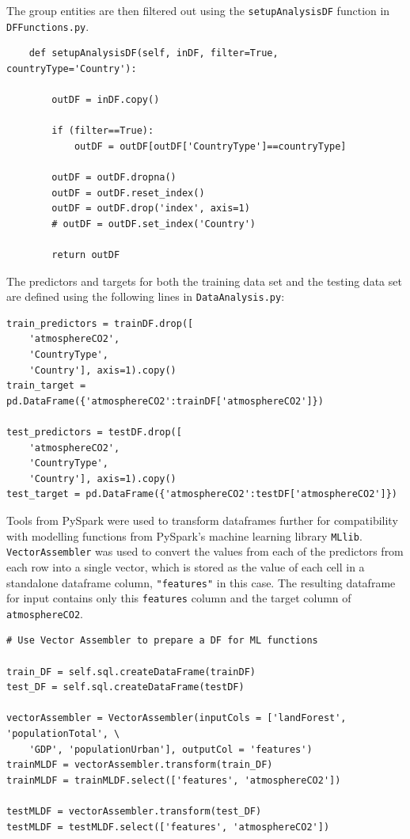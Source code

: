 \documentclass[11pt,a4paper,titlepage]{article}
\newcommand{\blankline}{\quad\pagebreak[2]}
\begin{document}
The group entities are then filtered out using the \texttt{setupAnalysisDF} function in \texttt{DFFunctions.py}. 

\begin{verbatim}
    def setupAnalysisDF(self, inDF, filter=True, countryType='Country'):

        outDF = inDF.copy()

        if (filter==True):
            outDF = outDF[outDF['CountryType']==countryType]

        outDF = outDF.dropna()
        outDF = outDF.reset_index()
        outDF = outDF.drop('index', axis=1)
        # outDF = outDF.set_index('Country')

        return outDF
\end{verbatim}

\blankline

The predictors and targets for both the training data set and the testing data set are defined using the following lines in \texttt{DataAnalysis.py}:

\begin{verbatim}
train_predictors = trainDF.drop([
    'atmosphereCO2',
    'CountryType',
    'Country'], axis=1).copy()
train_target = pd.DataFrame({'atmosphereCO2':trainDF['atmosphereCO2']})

test_predictors = testDF.drop([
    'atmosphereCO2',
    'CountryType',
    'Country'], axis=1).copy()
test_target = pd.DataFrame({'atmosphereCO2':testDF['atmosphereCO2']})
\end{verbatim}

\blankline

Tools from PySpark were used to transform dataframes further for compatibility with modelling functions from PySpark's machine learning library \texttt{MLlib}. \texttt{VectorAssembler} was used to convert the values from each of the predictors from each row into a single vector, which is stored as the value of each cell in a standalone dataframe column, \texttt{"features"} in this case. The resulting dataframe for input contains only this \texttt{features} column and the target column of \texttt{atmosphereCO2}. 

\begin{verbatim}
# Use Vector Assembler to prepare a DF for ML functions

train_DF = self.sql.createDataFrame(trainDF)
test_DF = self.sql.createDataFrame(testDF)

vectorAssembler = VectorAssembler(inputCols = ['landForest', 'populationTotal', \
    'GDP', 'populationUrban'], outputCol = 'features')
trainMLDF = vectorAssembler.transform(train_DF)
trainMLDF = trainMLDF.select(['features', 'atmosphereCO2'])

testMLDF = vectorAssembler.transform(test_DF)
testMLDF = testMLDF.select(['features', 'atmosphereCO2'])
\end{verbatim}
\end{document}
